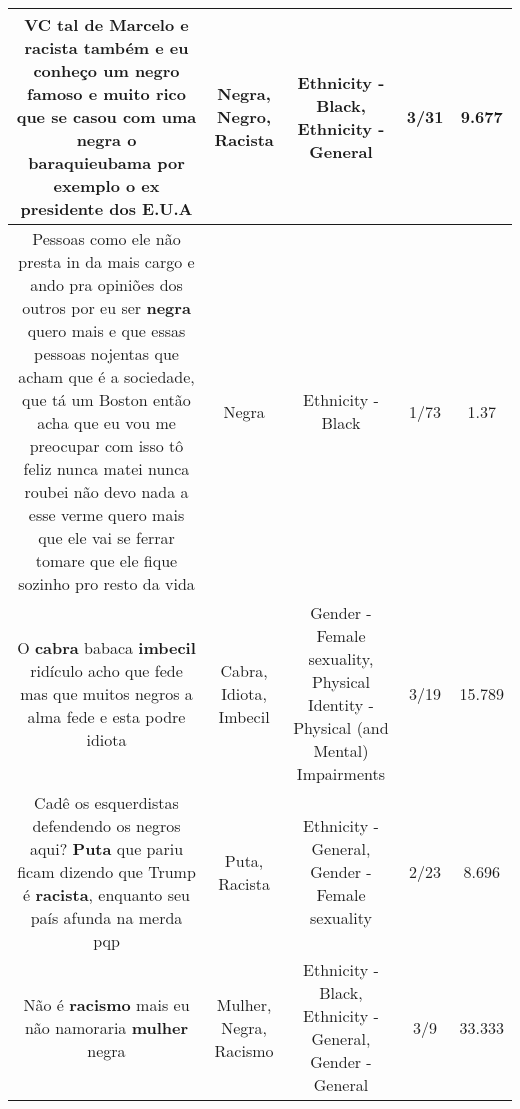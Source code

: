 \documentclass[11pt]{article}
\newlength\mylength
\begin{document}
\begin{center}
\begin{longtable}{|C{.65\mylength}|C{.30\mylength}|C{.12\mylength}|C{.12\mylength}|C{.12\mylength}|}
  \small VC tal de Marcelo e \textbf{racista} também e eu conheço um \textbf{negro} famoso e muito rico que se casou com uma \textbf{negra} o baraquieubama por exemplo o ex presidente dos E.U.A\normalsize   & Negra, Negro, Racista & Ethnicity - Black, Ethnicity - General & 3/31 & 9.677 \\  \hline
  \small Pessoas como ele não presta in da mais cargo e ando pra opiniões dos outros por eu ser \textbf{negra} quero mais e que essas pessoas nojentas que acham que é a sociedade, que tá um Boston então acha que eu vou me preocupar com isso tô feliz nunca matei nunca roubei não devo nada a esse verme quero mais que ele vai se ferrar tomare que ele fique sozinho pro resto da vida\normalsize   & Negra & Ethnicity - Black & 1/73 & 1.37 \\  \hline
  \small O \textbf{cabra} babaca \textbf{imbecil} ridículo acho que fede mas que muitos negros a alma fede e esta podre idiota\normalsize   & Cabra, Idiota, Imbecil & Gender - Female sexuality, Physical Identity - Physical (and Mental) Impairments & 3/19 & 15.789 \\  \hline
  \small Cadê os esquerdistas defendendo os negros aqui? \textbf{Puta} que pariu ficam dizendo que Trump é \textbf{racista}, enquanto seu país afunda na merda pqp\normalsize   & Puta, Racista & Ethnicity - General, Gender - Female sexuality & 2/23 & 8.696 \\  \hline
  \small Não é \textbf{racismo} mais  eu não namoraria \textbf{mulher} negra\normalsize   & Mulher, Negra, Racismo & Ethnicity - Black, Ethnicity - General, Gender - General & 3/9 & 33.333 \\  \hline

\end{longtable}
\end{center}
\end{document}
